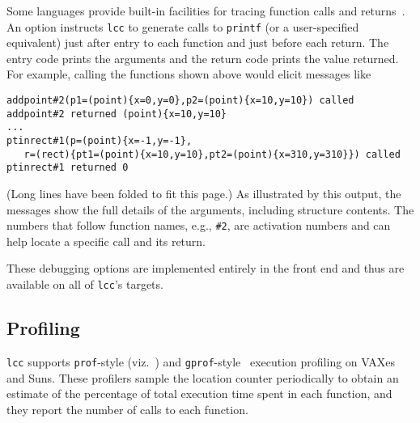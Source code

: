 Some languages provide built-in facilities for tracing function calls
and returns~\cite{griswold:griswold:90}.
An option instructs \verb|lcc| to generate calls to \verb|printf| (or a
user-specified equivalent) just after entry to each function
and just before each return.
The entry code prints the arguments and the return code prints the value
returned. For example, calling the
functions shown above would elicit messages like
\begin{verbatim}
addpoint#2(p1=(point){x=0,y=0},p2=(point){x=10,y=10}) called
addpoint#2 returned (point){x=10,y=10}
...
ptinrect#1(p=(point){x=-1,y=-1},
   r=(rect){pt1=(point){x=10,y=10},pt2=(point){x=310,y=310}}) called
ptinrect#1 returned 0
\end{verbatim}
(Long lines have been folded to fit this page.)
As illustrated by this output,
the messages show the full details of the arguments, including structure contents.
The numbers that follow function names, e.g., \verb|#2|,
are activation numbers and can help locate a specific call and its return.

These debugging options are implemented entirely in the front end and
thus are available on all of \verb|lcc|'s targets.

\subsection{Profiling}

\verb|lcc| supports \verb|prof|-style (viz.~\cite[\verb|prof| command]{bsd84})
and \verb|gprof|-style~\cite{graham:kessler:mckusick:83} execution profiling
on VAXes and Suns.
These profilers sample the location counter periodically
to obtain an estimate of the percentage of total execution time
spent in each function, and they report the number of calls to each function.


